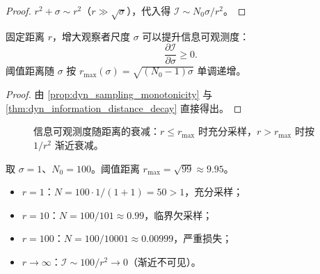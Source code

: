 \begin{proof}
$r^2+\sigma\sim r^2$（$r\gg\sqrt\sigma$），代入得 $\mathcal I\sim N_0\sigma/r^2$。
\end{proof}

\begin{proposition}[观察者尺度对信息可观测度的补偿]\label{prop:dyn_information_sigma_compensation}
固定距离 $r$，增大观察者尺度 $\sigma$ 可以提升信息可观测度：
\[
\frac{\partial \mathcal I}{\partial \sigma}\ge 0.
\]
阈值距离随 $\sigma$ 按 $r_{\max}(\sigma)=\sqrt{(N_0-1)\sigma}$ 单调递增。
\end{proposition}

\begin{proof}
由 \cref{prop:dyn_sampling_monotonicity} 与 \cref{thm:dyn_information_distance_decay} 直接得出。
\end{proof}

\begin{figure}[htbp]
\centering
{}
\caption{信息可观测度随距离的衰减：$r\le r_{\max}$ 时充分采样，$r>r_{\max}$ 时按 $1/r^2$ 渐近衰减。}
\label{fig:info_distance_decay}
\end{figure}

\begin{example}[数值实例：$\sigma=1$、$N_0=100$]\label{ex:dyn_information_numeric}
取 $\sigma=1$、$N_0=100$。阈值距离 $r_{\max}=\sqrt{99}\approx 9.95$。
\begin{itemize}
    \item $r=1$：$N=100\cdot 1/(1+1)=50>1$，充分采样；
    \item $r=10$：$N=100/101\approx 0.99$，临界欠采样；
    \item $r=100$：$N=100/10001\approx 0.00999$，严重损失；
    \item $r\to\infty$：$\mathcal I\sim 100/r^2\to 0$（渐近不可见）。
\end{itemize}
\end{example}

